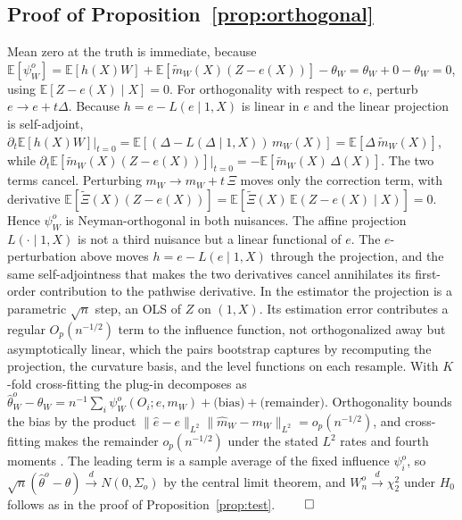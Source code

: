 \documentclass[preprint,11pt,authoryear]{elsarticle}
\theoremstyle{definition}
\newcommand{\E}{\mathbb{E}}
\newcommand{\convd}{\overset{d}{\longrightarrow}}
\begin{document}
\subsection*{Proof of Proposition~\ref{prop:orthogonal}}
Mean zero at the truth is immediate, because
$\E[\psi^o_W]=\E[h(X)W]+\E[\tilde m_W(X)(Z-e(X))]-\theta_W=\theta_W+0-\theta_W=0$,
using $\E[Z-e(X)\mid X]=0$. For orthogonality with respect to $e$, perturb
$e\to e+t\Delta$. Because $h=e-L(e\mid1,X)$ is linear in $e$ and the linear
projection is self-adjoint,
$\partial_t\E[h(X)W]\big|_{t=0}=\E[(\Delta-L(\Delta\mid1,X))\,m_W(X)]
=\E[\Delta\,\tilde m_W(X)]$, while
$\partial_t\E[\tilde m_W(X)(Z-e(X))]\big|_{t=0}=-\E[\tilde m_W(X)\,\Delta(X)]$. The
two terms cancel. Perturbing $m_W\to m_W+t\,\Xi$ moves only the correction term,
with derivative $\E[\tilde\Xi(X)(Z-e(X))]=\E[\tilde\Xi(X)\,\E(Z-e(X)\mid X)]=0$.
Hence $\psi^o_W$ is Neyman-orthogonal in both nuisances. The affine projection
$L(\cdot\mid1,X)$ is not a third nuisance but a linear functional of $e$. The
$e$-perturbation above moves $h=e-L(e\mid1,X)$ through the projection, and the same
self-adjointness that makes the two derivatives cancel annihilates its first-order
contribution to the pathwise derivative. In the estimator the projection is a
parametric $\sqrt n$ step, an OLS of $Z$ on $(1,X)$. Its estimation error contributes
a regular $O_p(n^{-1/2})$ term to the influence function, not orthogonalized away but
asymptotically linear, which the pairs bootstrap captures by recomputing the
projection, the curvature basis, and the level functions on each resample. With $K$-fold cross-fitting the
plug-in decomposes as
$\hat\theta^o_W-\theta_W=n^{-1}\sum_i\psi^o_W(O_i;e,m_W)
+\text{(bias)}+\text{(remainder)}$. Orthogonality bounds the bias by the product
$\|\hat e-e\|_{L^2}\|\hat m_W-m_W\|_{L^2}=o_p(n^{-1/2})$, and cross-fitting makes
the remainder $o_p(n^{-1/2})$ under the stated $L^2$ rates and fourth moments
\citep{chernozhukov2018}. The leading term is a sample average of the fixed
influence $\psi^o_i$, so $\sqrt n(\hat\theta^o-\theta)\convd N(0,\Sigma_o)$ by the
central limit theorem, and $W^o_n\convd\chi^2_2$ under $H_0$ follows as in the
proof of Proposition~\ref{prop:test}. \hfill$\qed$
\end{document}
